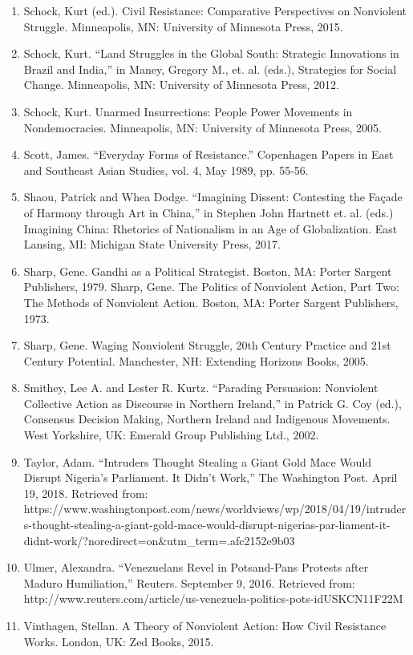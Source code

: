 \documentclass[twoside,a4paper,12pt,fleqn,openany]{extbook}
\begin{document}
\begin{enumerate}
\item Schock, Kurt (ed.). Civil Resistance: Comparative Perspectives on Nonviolent Struggle. Minneapolis, MN: University of Minnesota Press, 2015.
\item Schock, Kurt. “Land Struggles in the Global South: Strategic Innovations in Brazil and India,” in Maney, Gregory M., et. al. (eds.), Strategies for Social Change. Minneapolis, MN: University of Minnesota Press, 2012.
\item Schock, Kurt. Unarmed Insurrections: People Power Movements in Nondemocracies. Minneapolis, MN: University of Minnesota Press, 2005.
\item Scott, James. “Everyday Forms of Resistance.” Copenhagen Papers in East and Southeast Asian Studies, vol. 4, May 1989, pp. 55-56.
\item Shaou, Patrick and Whea Dodge. “Imagining Dissent: Contesting the Façade of Harmony through Art in China,” in Stephen John Hartnett et. al. (eds.) Imagining China: Rhetorics of Nationalism in an Age of Globalization. East Lansing, MI: Michigan State University Press, 2017.
\item Sharp, Gene. Gandhi as a Political Strategist. Boston, MA: Porter Sargent Publishers, 1979.
Sharp, Gene. The Politics of Nonviolent Action, Part Two: The Methods of Nonviolent Action. Boston, MA: Porter Sargent Publishers, 1973.
\item Sharp, Gene. Waging Nonviolent Struggle, 20th Century Practice and 21st Century Potential. Manchester, NH: Extending Horizons Books, 2005.
\item Smithey, Lee A. and Lester R. Kurtz. “Parading Persuasion: Nonviolent Collective Action as Discourse in Northern Ireland,” in Patrick G. Coy (ed.), Consensus Decision Making, Northern Ireland and Indigenous Movements. West Yorkshire, UK: Emerald Group Publishing Ltd., 2002.
\item Taylor, Adam. “Intruders Thought Stealing a Giant Gold Mace Would Disrupt Nigeria’s Parliament. It Didn’t Work,” The Washington Post. April 19, 2018. Retrieved from: https://www.washingtonpost.com/news/worldviews/wp/2018/04/19/intruders-thought-stealing-a-giant-gold-mace-would-disrupt-nigerias-par-liament-it-didnt-work/?noredirect=on&utm_term=.afc2152e9b03
\item Ulmer, Alexandra. “Venezuelans Revel in Potsand-Pans Protests after Maduro Humiliation,” Reuters. September 9, 2016. Retrieved from: http://www.reuters.com/article/us-venezuela-politics-pots-idUSKCN11F22M
\item Vinthagen, Stellan. A Theory of Nonviolent Action: How Civil Resistance Works. London, UK: Zed Books, 2015.

\end{enumerate}
\end{document}
